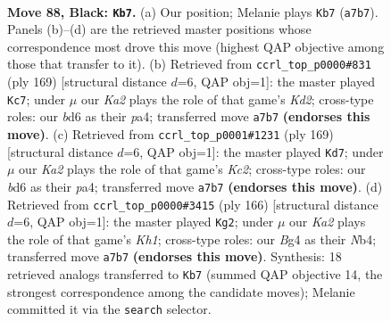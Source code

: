 \documentclass[11pt]{article}
\begin{document}
\clearpage

\begin{figure}[p]\centering
\begin{subfigure}{0.46\textwidth}\centering
\resizebox{\linewidth}{!}{%
\newchessgame
\chessboard[
  setfen={8/k7/3B4/8/p1p3b1/8/5K2/1N6 b - - 31 88},
  showmover=false,
  pgfstyle=straightmove, color=movearrow, markmove={a7-b7}
]}
\caption{}
\end{subfigure}\hfill
\begin{subfigure}{0.46\textwidth}\centering
\resizebox{\linewidth}{!}{%
\newchessgame
\chessboard[
  setfen={8/3k4/8/p1K5/P7/8/2N1p3/8 b - - 37 85},
  showmover=false,
  pgfstyle=straightmove, color=movearrow, markmove={d7-c7}
]}
\caption{}
\end{subfigure}
\\[4pt]
\begin{subfigure}{0.46\textwidth}\centering
\resizebox{\linewidth}{!}{%
\newchessgame
\chessboard[
  setfen={8/2k5/8/p7/P7/3N4/K3p3/8 b - - 15 85},
  showmover=false,
  pgfstyle=straightmove, color=movearrow, markmove={c7-d7}
]}
\caption{}
\end{subfigure}\hfill
\begin{subfigure}{0.46\textwidth}\centering
\resizebox{\linewidth}{!}{%
\newchessgame
\chessboard[
  setfen={8/4n3/4P3/6P1/1N6/8/4k3/7K w - - 5 84},
  showmover=false,
  pgfstyle=straightmove, color=movearrow, markmove={h1-g2}
]}
\caption{}
\end{subfigure}
\caption{\textbf{Move 88, Black: \texttt{Kb7}.} (a) Our position; Melanie plays \texttt{Kb7} (\texttt{a7b7}). Panels (b)--(d) are the retrieved master positions whose correspondence most drove this move (highest QAP objective among those that transfer to it). (b) Retrieved from \texttt{ccrl\_top\_p0000\#831} (ply 169) [structural distance $d$=6, QAP obj=1]: the master played \texttt{Kc7}; under $\mu$ our \emph{Ka2} plays the role of that game's \emph{Kd2}; cross-type roles: our \emph{b}d6 as their \emph{p}a4; transferred move \texttt{a7b7} \textbf{(endorses this move)}. (c) Retrieved from \texttt{ccrl\_top\_p0001\#1231} (ply 169) [structural distance $d$=6, QAP obj=1]: the master played \texttt{Kd7}; under $\mu$ our \emph{Ka2} plays the role of that game's \emph{Kc2}; cross-type roles: our \emph{b}d6 as their \emph{p}a4; transferred move \texttt{a7b7} \textbf{(endorses this move)}. (d) Retrieved from \texttt{ccrl\_top\_p0000\#3415} (ply 166) [structural distance $d$=6, QAP obj=1]: the master played \texttt{Kg2}; under $\mu$ our \emph{Ka2} plays the role of that game's \emph{Kh1}; cross-type roles: our \emph{B}g4 as their \emph{N}b4; transferred move \texttt{a7b7} \textbf{(endorses this move)}. Synthesis: 18 retrieved analogs transferred to \texttt{Kb7} (summed QAP objective 14, the strongest correspondence among the candidate moves); Melanie committed it via the \texttt{search} selector.}
\label{fig:thought-m175}
\end{figure}
\end{document}
